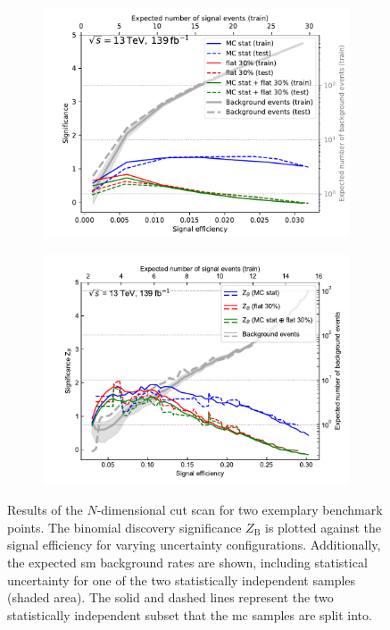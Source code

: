 \begin{figure}
	\centering
	\begin{subfigure}[b]{0.5\linewidth}
		\centering\includegraphics[width=1.0\textwidth]{N-1_cut_scan/z_vs_effs_300_150.pdf}
		\caption{}
	\end{subfigure}\hfill
	\begin{subfigure}[b]{0.5\linewidth}
		\centering\includegraphics[width=1.0\textwidth]{N-1_cut_scan/z_vs_effs_800_250.pdf}
		\caption{}
	\end{subfigure}\hfill

	\caption[N-dimensional cut scan results]{Results of the $N$-dimensional cut scan for two exemplary benchmark points. The binomial discovery significance $Z_\mathrm{B}$ is plotted against the signal efficiency for varying uncertainty configurations. Additionally, the expected \gls{sm} background rates are shown, including statistical uncertainty for one of the two statistically independent samples (shaded area). The solid and dashed lines represent the two statistically independent subset that the \gls{mc} samples are split into.}
	\label{fig:results_z_vs_eff}
\end{figure}

